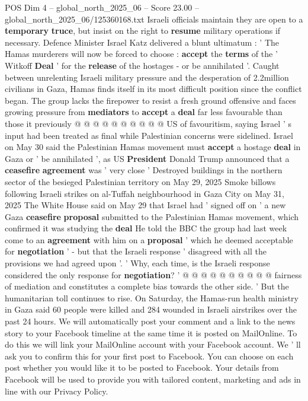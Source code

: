 \begin{textsample}{POS Dim 4 – global\_north\_2025\_06 – Score 23.00 – global\_north\_2025\_06/125360168.txt}
Israeli officials maintain they are open to a \textbf{temporary} \textbf{truce}, but insist on the right to \textbf{resume} military operations if necessary.
Defence Minister Israel Katz delivered a blunt ultimatum : ' The Hamas murderers will now be forced to choose : \textbf{accept} the \textbf{terms} of the ' Witkoff \textbf{Deal} ' for the \textbf{release} of the hostages - or be annihilated '.
Caught between unrelenting Israeli military pressure and the desperation of 2.2million civilians in Gaza, Hamas finds itself in its most difficult position since the conflict began.
The group lacks the firepower to resist a fresh ground offensive and faces growing pressure from \textbf{mediators} to \textbf{accept} a \textbf{deal} far less favourable than those it previously @ @ @ @ @ @ @ @ @ @ US of favouritism, saying Israel ' s input had been treated as final while Palestinian concerns were sidelined.
Israel on May 30 said the Palestinian Hamas movement must \textbf{accept} a hostage \textbf{deal} in Gaza or ' be annihilated ', as US \textbf{President} Donald Trump announced that a \textbf{ceasefire} \textbf{agreement} was ' very close ' Destroyed buildings in the northern sector of the besieged Palestinian territory on May 29, 2025 Smoke billows following Israeli strikes on al-Tuffah neighbourhood in Gaza City on May 31, 2025 The White House said on May 29 that Israel had ' signed off on ' a new Gaza \textbf{ceasefire} \textbf{proposal} submitted to the Palestinian Hamas movement, which confirmed it was studying the \textbf{deal} He told the BBC the group had last week come to an \textbf{agreement} with him on a \textbf{proposal} ' which he deemed acceptable for \textbf{negotiation} ' - but that the Israeli response ' disagreed with all the provisions we had agreed upon '. ' Why, each time, is the Israeli response considered the only response for \textbf{negotiation}? ' @ @ @ @ @ @ @ @ @ @ fairness of mediation and constitutes a complete bias towards the other side. ' But the humanitarian toll continues to rise.
On Saturday, the Hamas-run health ministry in Gaza said 60 people were killed and 284 wounded in Israeli airstrikes over the past 24 hours.
We will automatically post your comment and a link to the news story to your Facebook timeline at the same time it is posted on MailOnline.
To do this we will link your MailOnline account with your Facebook account.
We ' ll ask you to confirm this for your first post to Facebook.
You can choose on each post whether you would like it to be posted to Facebook.
Your details from Facebook will be used to provide you with tailored content, marketing and ads in line with our Privacy Policy.

\end{textsample}
